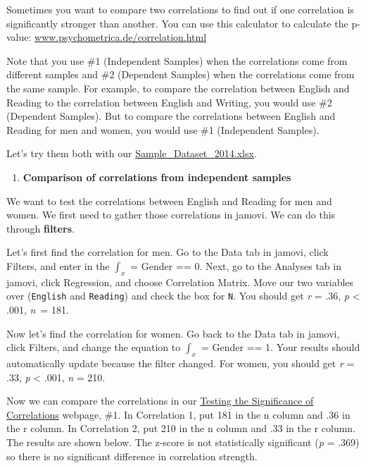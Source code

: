 \documentclass[
]{book}
\providecommand{\tightlist}{%
  \setlength{\itemsep}{0pt}\setlength{\parskip}{0pt}}
\begin{document}
Sometimes you want to compare two correlations to find out if one correlation is significantly stronger than another. You can use this calculator to calculate the p-value: \url{www.psychometrica.de/correlation.html}

Note that you use \#1 (Independent Samples) when the correlations come from different samples and \#2 (Dependent Samples) when the correlations come from the same sample. For example, to compare the correlation between English and Reading to the correlation between English and Writing, you would use \#2 (Dependent Samples). But to compare the correlations between English and Reading for men and women, you would use \#1 (Independent Samples).

Let's try them both with our \href{https://github.com/danawanzer/stats-with-jamovi/blob/master/data/Sample_Dataset_2014.xlsx}{Sample\_Dataset\_2014.xlsx}.

\begin{enumerate}
\def\labelenumi{\arabic{enumi}.}
\tightlist
\item
  \textbf{Comparison of correlations from independent samples}
\end{enumerate}

We want to test the correlations between English and Reading for men and women. We first need to gather those correlations in jamovi. We can do this through \textbf{filters}.

Let's first find the correlation for men. Go to the Data tab in jamovi, click Filters, and enter in the \(\int_x\) = Gender == 0. Next, go to the Analyses tab in jamovi, click Regression, and choose Correlation Matrix. Move our two variables over (\texttt{English} and \texttt{Reading}) and check the box for \texttt{N}. You should get \emph{r} = .36, \emph{p} \textless{} .001, \emph{n}~= 181.

Now let's find the correlation for women. Go back to the Data tab in jamovi, click Filters, and change the equation to \(\int_x\) = Gender == 1. Your results should automatically update because the filter changed. For women, you should get \emph{r} = .33, \emph{p} \textless{} .001, \emph{n} = 210.

Now we can compare the correlations in our \href{https://www.psychometrica.de/correlation.html}{Testing the Significance of Correlations} webpage, \#1. In Correlation 1, put 181 in the n column and .36 in the r column. In Correlation 2, put 210 in the n column and .33 in the r column. The results are shown below. The z-score is not statistically significant (\emph{p} = .369) so there is no significant difference in correlation strength.
\end{document}
